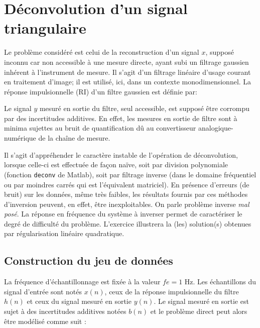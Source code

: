 \chapter{Déconvolution d'un signal triangulaire}

Le problème considéré est celui de la reconstruction d'un signal $x$, supposé inconnu car non accessible à une mesure directe, ayant subi un filtrage gaussien inhérent à l'instrument de mesure. Il s'agit d'un filtrage linéaire d'usage courant en traitement d'image; il est utilisé, ici, dans un contexte monodimensionnel. La réponse impulsionnelle (RI) d'un filtre gaussien est définie par:


Le signal $y$ mesuré en sortie du filtre, seul accessible, est supposé être corrompu par des incertitudes additives. En effet, les mesures en sortie de filtre sont à minima sujettes au bruit de
quantification dû au convertisseur analogique-numérique de la chaîne de mesure.

Il s'agit d'appréhender le caractère instable de l'opération de déconvolution, lorsque celle-ci est effectuée de façon  \guillemotleft naïve\guillemotright, soit par division polynomiale (fonction \texttt{deconv} de Matlab), soit par filtrage inverse (dans le domaine fréquentiel ou par moindres carrés qui est l'équivalent matriciel). En présence d'erreurs (de bruit) sur les données, même très faibles, les résultats fournis par ces
méthodes d'inversion peuvent, en effet, être inexploitables. On parle problème inverse \emph{mal posé}. La réponse en fréquence du système à inverser permet de caractériser le degré de difficulté du problème. L'exercice illustrera la (les) solution(s) obtenues par régularisation linéaire quadratique.

\section{Construction du jeu de données}

La fréquence d'échantillonnage est fixée à la valeur $fe = 1$ Hz. Les échantillons du signal d'entrée sont notés $x(n)$, ceux de la réponse impulsionnelle du filtre $h(n)$ et ceux du signal mesuré en sortie $y(n)$. Le signal mesuré en sortie est sujet à des incertitudes additives notées $b(n)$ et le problème direct peut alors être modélisé comme suit :

